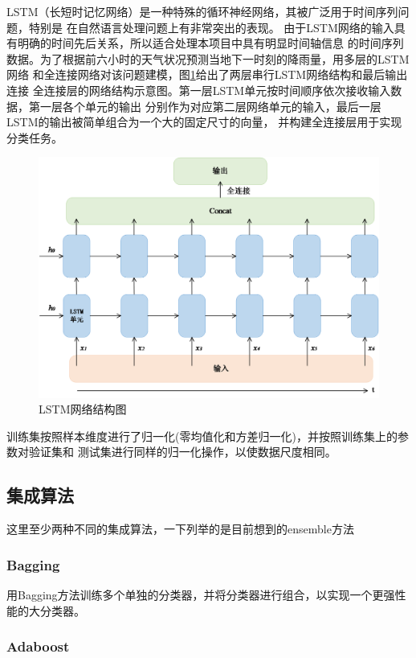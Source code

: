 \documentclass[UTF8]{ctexart}
\begin{document}
LSTM（长短时记忆网络）是一种特殊的循环神经网络，其被广泛用于时间序列问题，特别是
在自然语言处理问题上有非常突出的表现。
由于LSTM网络的输入具有明确的时间先后关系，所以适合处理本项目中具有明显时间轴信息
的时间序列数据。为了根据前六小时的天气状况预测当地下一时刻的降雨量，用多层的LSTM网络
和全连接网络对该问题建模，图\ref{fig:lstm}给出了两层串行LSTM网络结构和最后输出连接
全连接层的网络结构示意图。第一层LSTM单元按时间顺序依次接收输入数据，第一层各个单元的输出
分别作为对应第二层网络单元的输入，最后一层LSTM的输出被简单组合为一个大的固定尺寸的向量，
并构建全连接层用于实现分类任务。

\begin{figure}[h]
    \centering
    \includegraphics[scale=0.6]{figures/lstm.png}
    \caption{LSTM网络结构图}
    \label{fig:lstm}
\end{figure}

训练集按照样本维度进行了归一化(零均值化和方差归一化)，并按照训练集上的参数对验证集和
测试集进行同样的归一化操作，以使数据尺度相同。

\subsection{集成算法}
这里至少两种不同的集成算法，一下列举的是目前想到的ensemble方法

\subsubsection{Bagging}
用Bagging方法训练多个单独的分类器，并将分类器进行组合，以实现一个更强性能的大分类器。

\subsubsection{Adaboost}
\end{document}
